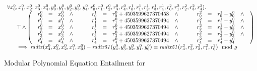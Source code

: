 \begin{figure}
  \centering
  \[
  \begin{array}{l}
  \forall 
     {x}^0_0, {x}^0_1, {x}^0_2,
     {x}^0_3, {x}^0_4,
     {y}^0_0, {y}^0_1, {y}^0_2,
     {y}^0_3, {y}^0_4,
     {r}^0_0, {r}^0_1, {r}^0_2,
     {r}^0_3, {r}^0_4,
     {r}^1_0, {r}^1_1, {r}^1_2,
     {r}^1_3, {r}^1_4,
     {r}^2_0, {r}^2_1, {r}^2_2,
     {r}^2_3, {r}^2_4).\\
  \hspace{.05\textwidth}\top \wedge
  \left(
  \begin{array}{lclcl}
    \begin{array}{rclc}
      {r}^0_0 & = & {x}^0_0 & \wedge \\
      {r}^0_1 & = & {x}^0_1 & \wedge \\
      {r}^0_2 & = & {x}^0_2 & \wedge \\
      {r}^0_3 & = & {x}^0_3 & \wedge \\
      {r}^0_4 & = & {x}^0_4 & \wedge \\
    \end{array}
    &\hspace{.01\textwidth}&
    \begin{array}{rclc}
      {r}^1_0 & = & {r}^0_0 + {4503599627370458} & \wedge \\
      {r}^1_1 & = & {r}^0_1 + {4503599627370494} & \wedge \\
      {r}^1_2 & = & {r}^0_2 + {4503599627370494} & \wedge \\
      {r}^1_3 & = & {r}^0_3 + {4503599627370494} & \wedge \\
      {r}^1_4 & = & {r}^0_4 + {4503599627370494} & \wedge\\
    \end{array}
    &\hspace{.01\textwidth}&
    \begin{array}{rclc}
      {r}^2_0 & = & {r}^1_0 - {y}^0_0 & \wedge \\
      {r}^2_1 & = & {r}^1_1 - {y}^0_1 & \wedge \\
      {r}^2_2 & = & {r}^1_2 - {y}^0_2 & \wedge \\
      {r}^2_3 & = & {r}^1_3 - {y}^0_3 & \wedge \\
      {r}^2_4 & = & {r}^1_4 - {y}^0_4
    \end{array}
  \end{array}
  \right)\\
    \hspace{.05\textwidth}
    \implies 
    \mathit{radix}({x}^0_4, {x}^0_3, {x}^0_2, {x}^0_1, {x}^0_0) -
    \mathit{radix51}({y}^0_4, {y}^0_3, {y}^0_2, {y}^0_1, {y}^0_0)
    \equiv
    \mathit{radix51}({r}^2_4, {r}^2_3, {r}^2_2, {r}^2_1, {r}^2_0)
    \mod \myprime
  \end{array}
  \]
  \caption{Modular Polynomial Equation Entailment for }
  \label{figure:translation:subtraction-polynomial}
\end{figure}

